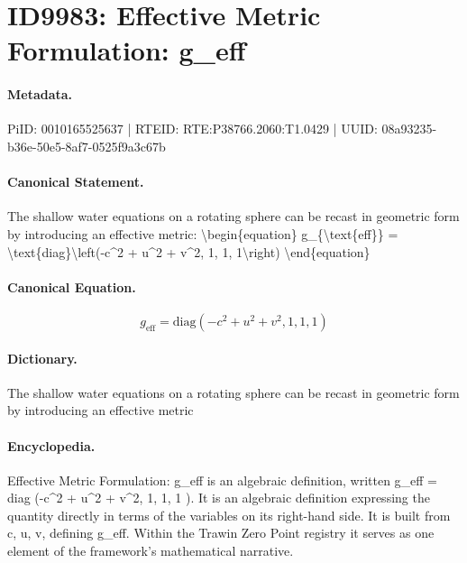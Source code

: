 \section*{ID9983: Effective Metric Formulation: g\_eff}
\paragraph{Metadata.}
PiID: 0010165525637 | RTEID: RTE:P38766.2060:T1.0429 | UUID: 08a93235-b36e-50e5-8af7-0525f9a3c67b

\paragraph{Canonical Statement.}
The shallow water equations on a rotating sphere can be recast in geometric form by introducing an effective metric: \textbackslash{}begin\{equation\} g\_\{\textbackslash{}text\{eff\}\} = \textbackslash{}text\{diag\}\textbackslash{}left(-c\textasciicircum{}2 + u\textasciicircum{}2 + v\textasciicircum{}2, 1, 1, 1\textbackslash{}right) \textbackslash{}end\{equation\}

\paragraph{Canonical Equation.}
\[
g_{\text{eff}} = \text{diag}\left(-c^2 + u^2 + v^2, 1, 1, 1\right)
\]

\paragraph{Dictionary.}
The shallow water equations on a rotating sphere can be recast in geometric form by introducing an effective metric

\paragraph{Encyclopedia.}
Effective Metric Formulation: g\_eff is an algebraic definition, written g\_eff = diag (-c\textasciicircum{}2 + u\textasciicircum{}2 + v\textasciicircum{}2, 1, 1, 1 ). It is an algebraic definition expressing the quantity directly in terms of the variables on its right-hand side. It is built from c, u, v, defining g\_eff. Within the Trawin Zero Point registry it serves as one element of the framework's mathematical narrative.
